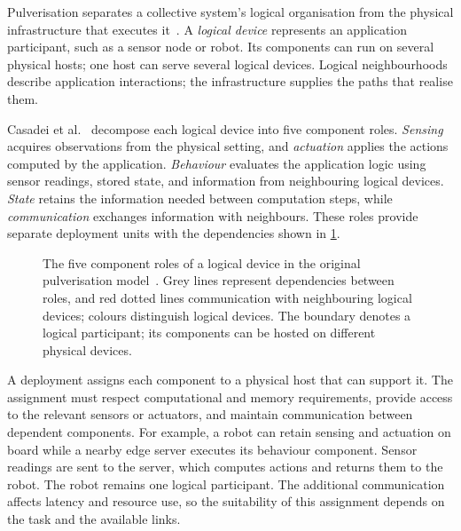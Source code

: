 Pulverisation separates a collective system's logical organisation from the physical infrastructure that executes it~\cite{DBLP:journals/fi/CasadeiPPVW20}.
A \emph{logical device} represents an application participant,
such as a sensor node or robot.
Its components can run on several physical hosts;
one host can serve several logical devices.
Logical neighbourhoods describe application interactions;
the infrastructure supplies the paths that realise them.

Casadei et al.~\cite{DBLP:journals/fi/CasadeiPPVW20} decompose each logical device into five component roles.
\emph{Sensing} acquires observations from the physical setting,
and \emph{actuation} applies the actions computed by the application.
\emph{Behaviour} evaluates the application logic using sensor readings,
stored state,
and information from neighbouring logical devices.
\emph{State} retains the information needed between computation steps,
while \emph{communication} exchanges information with neighbours.
These roles provide separate deployment units with the dependencies shown in \cref{fig:pulverisation-components}.

\begin{figure}[tbp]
    \centering
    
    \caption[The five component roles of a logical device]{The five component roles of a logical device in the original pulverisation model~\cite{DBLP:journals/fi/CasadeiPPVW20}. Grey lines represent dependencies between roles, and red dotted lines communication with neighbouring logical devices; colours distinguish logical devices. The boundary denotes a logical participant; its components can be hosted on different physical devices.}
    \label{fig:pulverisation-components}
\end{figure}

A deployment assigns each component to a physical host that can support it.
The assignment must respect computational and memory requirements,
provide access to the relevant sensors or actuators,
and maintain communication between dependent components.
For example,
a robot can retain sensing and actuation on board while a nearby edge server executes its behaviour component.
Sensor readings are sent to the server,
which computes actions and returns them to the robot.
The robot remains one logical participant.
The additional communication affects latency and resource use,
so the suitability of this assignment depends on the task and the available links.

